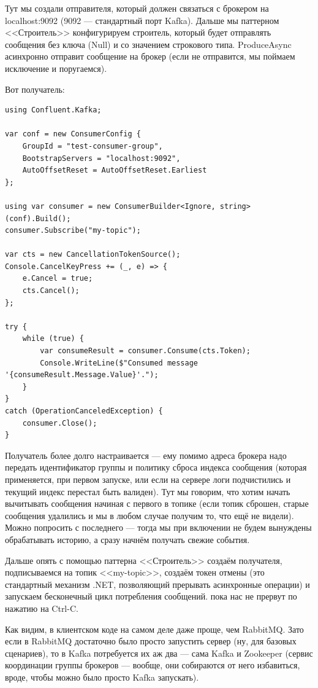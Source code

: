 \documentclass[a5paper]{article}
\begin{document}
Тут мы создали отправителя, который должен связаться с брокером на localhost:9092 (9092 --- стандартный порт Kafka). Дальше мы паттерном <<Строитель>> конфигурируем строитель, который будет отправлять сообщения без ключа (Null) и со значением строкового типа. ProduceAsync асинхронно отправит сообщение на брокер (если не отправится, мы поймаем исключение и поругаемся).

Вот получатель: 

\begin{verbatim}
using Confluent.Kafka;

var conf = new ConsumerConfig {
    GroupId = "test-consumer-group",
    BootstrapServers = "localhost:9092",
    AutoOffsetReset = AutoOffsetReset.Earliest
};

using var consumer = new ConsumerBuilder<Ignore, string>(conf).Build();
consumer.Subscribe("my-topic");

var cts = new CancellationTokenSource();
Console.CancelKeyPress += (_, e) => {
    e.Cancel = true;
    cts.Cancel();
};

try {
    while (true) {
        var consumeResult = consumer.Consume(cts.Token);
        Console.WriteLine($"Consumed message '{consumeResult.Message.Value}'.");
    }
}
catch (OperationCanceledException) {
    consumer.Close();
}
\end{verbatim}

Получатель более долго настраивается --- ему помимо адреса брокера надо передать идентификатор группы и политику сброса индекса сообщения (которая применяется, при первом запуске, или если на сервере логи подчистились и текущий индекс перестал быть валиден). Тут мы говорим, что хотим начать вычитывать сообщения начиная с первого в топике (если топик сброшен, старые сообщения удалились и мы в любом случае получим то, что ещё не видели). Можно попросить с последнего --- тогда мы при включении не будем вынуждены обрабатывать историю, а сразу начнём получать свежие события.

Дальше опять с помощью паттерна <<Строитель>> создаём получателя, подписываемся на топик <<my-topic>>, создаём токен отмены (это стандартный механизм .NET, позволяющий прерывать асинхронные операции) и запускаем бесконечный цикл потребления сообщений. пока нас не прервут по нажатию на Ctrl-C.

Как видим, в клиентском коде на самом деле даже проще, чем RabbitMQ. Зато если в RabbitMQ достаточно было просто запустить сервер (ну, для базовых сценариев), то в Kafka потребуется их аж два --- сама Kafka и Zookeeper (сервис координации группы брокеров --- вообще, они собираются от него избавиться, вроде, чтобы можно было просто Kafka запускать).

\end{document}
